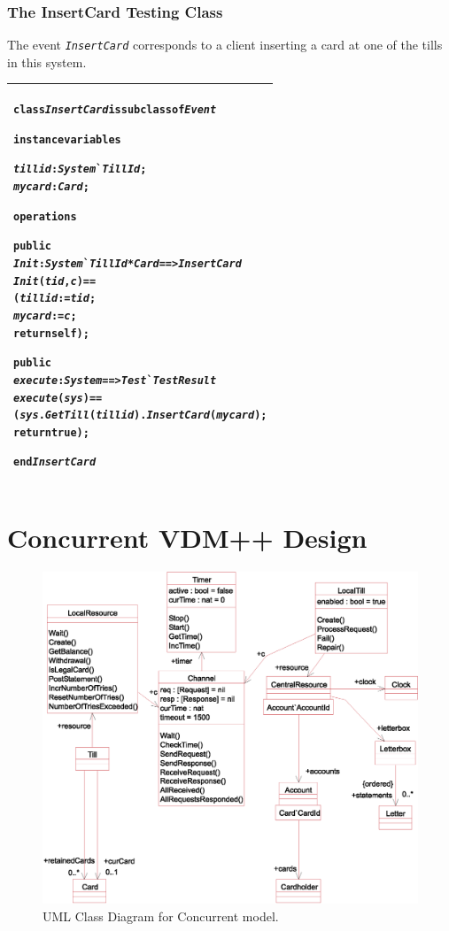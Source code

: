 \documentclass[\pformat,12pt,twoside]{article}
\newenvironment{VDMgray}%
{\begin{tabular}{|G|}\hline\small\begin{alltt}}%
{\end{alltt}\normalsize\\
 \hline\end{tabular}}
\begin{document}
\newpage
\subsubsection{The InsertCard Testing Class}

The event \texttt{\emph{InsertCard}} corresponds to a client inserting a 
card at one of the tills in this system.

\begin{VDMgray}
\textbf{class} \textit{InsertCard} \textbf{is} \textbf{subclass} \textbf{of} \textit{Event}

\textbf{instance} \textbf{variables}

 \textit{tillid} : \textit{System}\`{}\textit{TillId};
 \textit{mycard} : \textit{Card};

\textbf{operations}

 \textbf{public}
 \textit{Init}: \textit{System}\`{}\textit{TillId} * \textit{Card} ==\texttt{>} \textit{InsertCard}
 \textit{Init}(\textit{tid},\textit{c}) ==
   (\textit{tillid} := \textit{tid};
    \textit{mycard} := \textit{c};
    \textbf{return} \textbf{self});

 \textbf{public}
 \textit{execute}: \textit{System} ==\texttt{>} \textit{Test}\`{}\textit{TestResult}
 \textit{execute}(\textit{sys}) ==
   (\textit{sys}.\textit{GetTill}(\textit{tillid}).\textit{InsertCard}(\textit{mycard});
    \textbf{return} \textbf{true});

\textbf{end} \textit{InsertCard}
\end{VDMgray}

\newpage
\section{Concurrent VDM++ Design}\label{app:Concur}


\begin{figure}[htbp]
\begin{center}
\includegraphics[width=.9\textwidth]{concurrent2}
\caption{UML Class Diagram for Concurrent model.\label{fig:UMLconcur}}
\end{center}
\end{figure}
\end{document}
